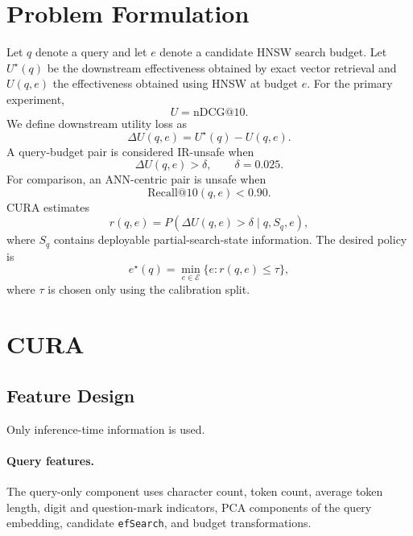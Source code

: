 \documentclass[10pt,twocolumn]{article}
\newcommand{\cura}{CURA}
\newcommand{\ef}{\texttt{efSearch}}
\begin{document}
\section{Problem Formulation}
\label{sec:problem}
Let $q$ denote a query and let $e$ denote a candidate HNSW search budget. Let $U^\star(q)$ be the downstream effectiveness obtained by exact vector retrieval and $U(q,e)$ the effectiveness obtained using HNSW at budget $e$. For the primary experiment,
\[
U=\mathrm{nDCG}@10.
\]
We define downstream utility loss as
\begin{equation}
\Delta U(q,e)=U^\star(q)-U(q,e).
\label{eq:utilityloss}
\end{equation}
A query-budget pair is considered IR-unsafe when
\begin{equation}
\Delta U(q,e)>\delta,\qquad \delta=0.025.
\label{eq:irunsafe}
\end{equation}
For comparison, an ANN-centric pair is unsafe when
\begin{equation}
\mathrm{Recall}@10(q,e)<0.90.
\label{eq:annunsafe}
\end{equation}
\cura{} estimates
\begin{equation}
r(q,e)=P\left(\Delta U(q,e)>\delta\mid q,S_q,e\right),
\label{eq:risk}
\end{equation}
where $S_q$ contains deployable partial-search-state information. The desired policy is
\begin{equation}
e^\star(q)=\min_{e\in\mathcal E}\{e:r(q,e)\le\tau\},
\label{eq:budgetselection}
\end{equation}
where $\tau$ is chosen only using the calibration split.

\section{CURA}
\label{sec:method}
\subsection{Feature Design}
Only inference-time information is used.

\paragraph{Query features.}
The query-only component uses character count, token count, average token length, digit and question-mark indicators, PCA components of the query embedding, candidate \ef{}, and budget transformations.
\end{document}
